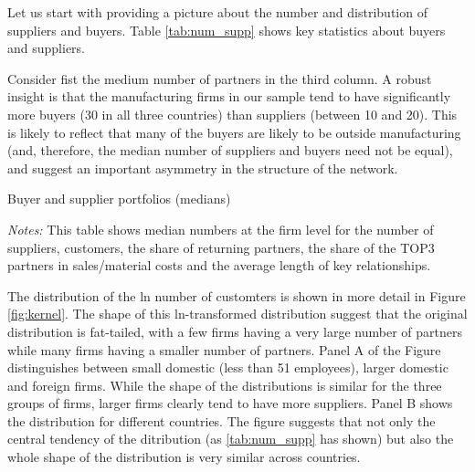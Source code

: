 \documentclass[final, dvipsnames, authoryear,12pt]{elsarticle}
\begin{document}
Let us start with providing a picture about the number and distribution of suppliers and buyers. Table \ref{tab:num_supp} shows key statistics about buyers and suppliers. 

Consider fist the medium number of partners in the third column. A robust insight is that the manufacturing firms in our sample tend to have significantly more buyers (30 in all three countries) than suppliers (between 10 and 20). This is likely to reflect that many of the buyers are likely to be outside manufacturing (and, therefore, the median number of suppliers and buyers need not be equal), and suggest an important asymmetry in the structure of the network. 

\begin{table}[H]
    \caption{Buyer and supplier portfolios (medians)}
    \label{tab:num_supp}
    \centerline{
    }
    {\scriptsize \textit{Notes:} This table shows median numbers at the firm level for the number of suppliers, customers, the share of returning partners, the share of the TOP3 partners in sales/material costs and the average length of key relationships.}
\end{table}


The distribution of the ln number of customters is shown in more detail in Figure \ref{fig:kernel}. The shape of this ln-transformed distribution suggest that the original distribution is fat-tailed, with a few firms having a very large number of partners while many firms having a smaller number of partners. Panel A of the Figure distinguishes between small domestic (less than 51 employees), larger domestic and foreign firms. While the shape of the distributions is similar for the three groups of firms, larger firms clearly tend to have more suppliers. Panel B shows the distribution for different countries. The figure suggests that not only the central tendency of the ditribution (as \ref{tab:num_supp} has shown) but also the whole shape of the distribution is very similar across countries.
\end{document}
